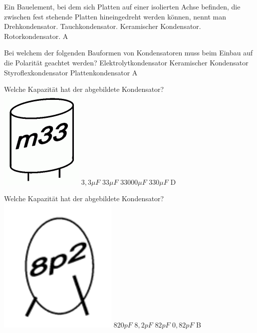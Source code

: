 {Ein Bauelement, bei dem sich Platten auf einer isolierten Achse befinden, die zwischen fest stehende Platten hineingedreht werden können, nennt man}%
{Drehkondensator.}%
{Tauchkondensator.}%
{Keramischer Kondensator.}%
{Rotorkondensator.}%
{A}%

{Bei welchem der folgenden Bauformen von
Kondensatoren muss beim Einbau auf die
Polarität geachtet werden?}%
{Elektrolytkondensator}%
{Keramischer Kondensator}%
{Styroflexkondensator}%
{Plattenkondensator}%
{A}%

{Welche Kapazität hat der abgebildete Kondensator?\\
\includegraphics[scale=0.3]{Kondensator/Bilder/TC203.png}
}%
{$3,3\mu F$}%
{$33\mu F$}%
{$33000\mu F$}%
{$330\mu F$}%
{D}%

{Welche Kapazität hat der abgebildete Kondensator?\\
\includegraphics[scale=0.9]{Kondensator/Bilder/TC205.png}
}%
{$820pF$}%
{$8,2pF$}%
{$82pF$}%
{$0,82pF$}%
{B}%